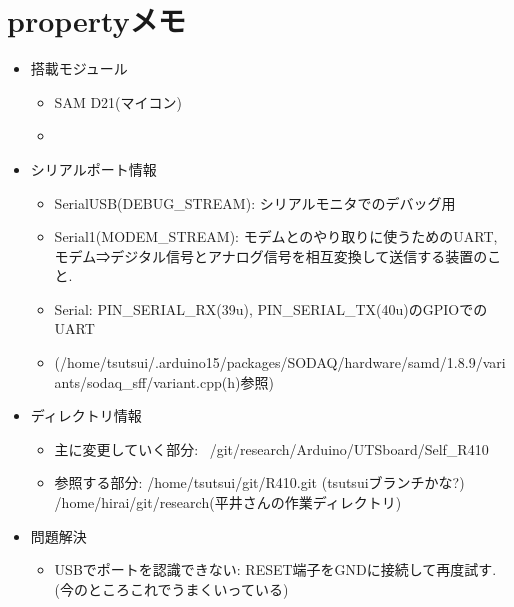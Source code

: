 \documentclass[11pt,a4paper,uplatex]{jsarticle}
\begin{document}
\section{propertyメモ}
\begin{itemize}
    \item 搭載モジュール
    \begin{itemize}
        \item SAM D21(マイコン)
        \item 
    \end{itemize}
    \item シリアルポート情報
    \begin{itemize}
        \item SerialUSB(DEBUG_STREAM): シリアルモニタでのデバッグ用
        \item Serial1(MODEM_STREAM): モデムとのやり取りに使うためのUART, モデム⇒デジタル信号とアナログ信号を相互変換して送信する装置のこと.
        \item Serial: PIN_SERIAL_RX(39u), PIN_SERIAL_TX(40u)のGPIOでのUART
        \item (/home/tsutsui/.arduino15/packages/SODAQ/hardware/samd/1.8.9/variants/sodaq_sff/variant.cpp(h)参照)
    \end{itemize}

    \item ディレクトリ情報
    \begin{itemize}
        \item 主に変更していく部分: ~/git/research/Arduino/UTSboard/Self_R410
        \item 参照する部分: /home/tsutsui/git/R410.git (tsutsuiブランチかな?) \\
        /home/hirai/git/research(平井さんの作業ディレクトリ)
    \end{itemize}

    \item 問題解決
    \begin{itemize}
        \item USBでポートを認識できない: RESET端子をGNDに接続して再度試す. (今のところこれでうまくいっている)
    \end{itemize}


\end{itemize}
\end{document}
